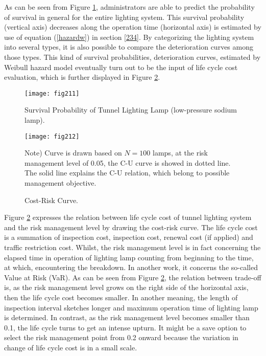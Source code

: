 As can be seen from Figure \ref{fig211}, administrators are able to predict the probability of survival in general for the entire lighting system. This survival probability (vertical axis) decreases along the operation time (horizontal axis) is estimated by use of equation (\ref{hazardw}) in section \ref{234}. By categorizing the lighting system into several types, it is also possible to compare the deterioration curves among those types. This kind of survival probabilities, deterioration curves, estimated by Weibull hazard model eventually turn out to be the input of life cycle cost evaluation, which is further displayed in Figure \ref{fig212}.
\begin{figure}[t]
\begin{center}
\texttt{[image: fig211]} 
\end{center}
\caption{Survival Probability of Tunnel Lighting Lamp (low-pressure sodium lamp).}
\label{fig211} 
\end{figure}
\begin{figure}[t]
\begin{center}
\texttt{[image: fig212]} 
\end{center}
\footnotesize Note) Curve is drawn based on $N=100$ lamps, at the risk management level of 0.05, the C-U curve is showed in dotted line. The solid line explains the C-U relation, which belong to possible management objective.
\caption{Cost-Risk Curve.}
\label{fig212} 
\end{figure}

Figure \ref{fig212} expresses the relation between life cycle cost of tunnel lighting system and the risk management level by drawing the cost-risk curve. The life cycle cost is a summation of inspection cost, inspection cost, renewal cost (if applied) and traffic restriction cost. Whilst, the risk management level is in fact concerning the elapsed time in operation of lighting lamp counting from beginning to the time, at which, encountering the breakdown. In another work, it concerns the so-called Value at Risk (VaR). As can be seen from Figure \ref{fig212}, the relation between trade-off is, as the risk management level grows on the right side of the horizontal axis, then the life cycle cost becomes smaller. In another meaning, the length of inspection interval sketches longer and maximum operation time of lighting lamp is determined. In contrast, as the risk management level becomes smaller than 0.1, the life cycle turns to get an intense upturn. It might be a save option to select the risk management point from 0.2 onward because the variation in change of life cycle cost is in a small scale.
